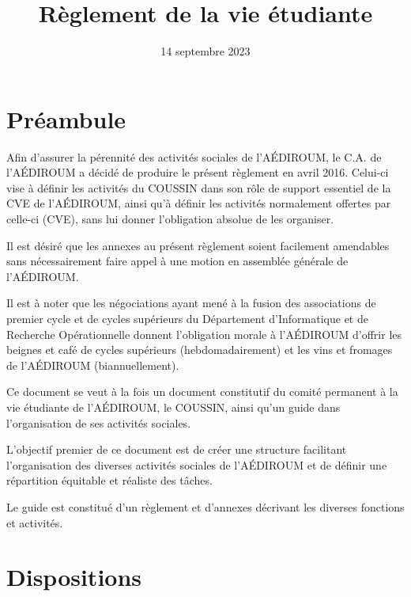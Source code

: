\documentclass{aediroum}
\title{Règlement de la vie étudiante}
\date{14 septembre 2023}
\begin{document}
\maketitle

\section{Préambule}\label{sec:preambule}
Afin d'assurer la pérennité des activités sociales de l'AÉDIROUM, le C.A. de l'AÉDIROUM a décidé de produire le présent règlement en avril 2016. Celui-ci vise à définir les activités du COUSSIN dans son rôle de support essentiel de la CVE de l'AÉDIROUM, ainsi qu'à définir les activités normalement offertes par celle-ci (CVE), sans lui donner l'obligation absolue de les organiser.

Il est désiré que les annexes au présent règlement soient facilement amendables sans nécessairement faire appel à une motion en assemblée générale de l'AÉDIROUM.

Il est à noter que les négociations ayant mené à la fusion des associations de premier cycle et de cycles supérieurs du Département d'Informatique et de Recherche Opérationnelle donnent l'obligation morale à l'AÉDIROUM d'offrir les beignes et café de cycles supérieurs (hebdomadairement) et les vins et fromages de l'AÉDIROUM (biannuellement).

Ce document se veut à la fois un document constitutif du comité permanent à la vie étudiante de l'AÉDIROUM, le COUSSIN, ainsi qu'un guide dans l'organisation de ses activités sociales.

L'objectif premier de ce document est de créer une structure facilitant l'organisation des diverses activités sociales de l'AÉDIROUM et de définir une répartition équitable et réaliste des tâches.

Le guide est constitué d'un règlement et d'annexes décrivant les diverses fonctions et activités.

\section{Dispositions}\label{sec:dispositions}
\end{document}
